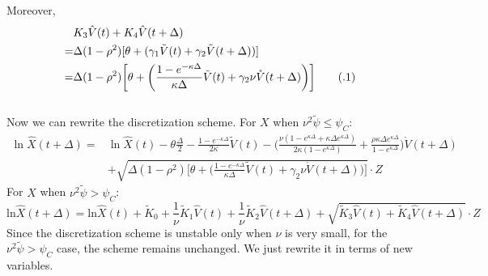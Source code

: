 \documentclass{ws-ijfe}
\newcommand\numberthis{\addtocounter{equation}{1}\tag{\theequation}}
\begin{document}
Moreover,
\begin{align*}
&K_3\hat{V}(t)+K_4\hat{V}(t+\Delta)\\
=&\Delta(1-\rho^2)[\theta+(\gamma_1\tilde{V}(t)+\gamma_2\tilde{V}(t+\Delta))]\\
=&\Delta(1-\rho^2)\bigg[\theta+\bigg(\frac{1-e^{-\kappa\Delta}}{\kappa\Delta}\tilde{V}(t)+\gamma_2\nu \mathring{V}(t+\Delta)\bigg)\bigg]\numberthis\label{QEK3K4}
\end{align*}
\\
Now we can rewrite the discretization scheme.
For $X$ when $\nu^2\tilde{\psi} \leq \psi_C $:
\begin{equation}\label{newLnX}
\begin{split}
  \ln\hat{X}(t+\Delta)=&\ln\hat{X}(t)-\theta\frac{\Delta}{2}-\frac{1-e^{-\kappa\Delta}}{2\kappa}\tilde{V}(t)-\bigg(\frac{\nu(1-e^{\kappa\Delta}+\kappa\Delta e^{\kappa\Delta})}{2\kappa(1-e^{\kappa\Delta})}+\frac{\rho\kappa\Delta e^{\kappa\Delta}}{1-e^{\kappa\Delta}}\bigg)\mathring{V}(t+\Delta)\\
  &+\sqrt{\Delta(1-\rho^2)\bigg[\theta+\bigg(\frac{1-e^{-\kappa\Delta}}{\kappa\Delta}\tilde{V}(t)+\gamma_2\nu \mathring{V}(t+\Delta)\bigg)\bigg]}\cdot Z
\end{split}
\end{equation}
For $X$ when $\nu^2\tilde{\psi} > \psi_C $:
\begin{equation}\label{newLnX2}
  \text{ln}\hat{X}(t+\Delta)=\text{ln}\hat{X}(t)+\tilde{K}_0+\frac{1}{\nu}\tilde{K}_1\hat{V}(t)+\frac{1}{\nu}\tilde{K}_2\hat{V}(t+\Delta)+\sqrt{\tilde{K}_3\hat{V}(t)+\tilde{K}_4\hat{V}(t+\Delta)}\cdot Z
\end{equation}
Since the discretization scheme is unstable only when $\nu$ is very small, for the $\nu^2\tilde{\psi} > \psi_C $ case, the scheme remains unchanged. We just rewrite it in terms of new variables. 
\end{document}
